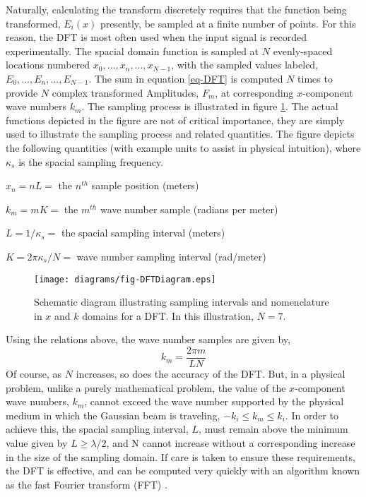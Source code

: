 \documentclass[12pt]{uthesis-v12}
\begin{document}
Naturally, calculating the transform discretely requires that the function being transformed, $E_i(x)$ presently, be sampled at a finite number of points. For this reason, the DFT is most often used when the input signal is recorded experimentally. The spacial domain function is sampled at $N$ evenly-spaced locations numbered $x_0, ..., x_n, ..., x_{N-1}$, with the sampled values labeled, $E_0, ..., E_n, ..., E_{N-1}$.  The sum in equation \ref{eq-DFT} is computed $N$ times to provide $N$ complex transformed Amplitudes, $F_m$, at corresponding $x$-component wave numbers $k_m$. The sampling process is illustrated in figure \ref{fig-DFTDiagram}. The actual functions depicted in the figure are not of critical importance, they are simply used to illustrate the sampling process and related quantities. The figure depicts the following quantities (with example units to assist in physical intuition), where $\kappa_s$ is the spacial sampling frequency. 

$x_n = nL =$ the $n^{th}$ sample position (meters)

$k_m = mK =$ the $m^{th}$ wave number sample (radians per meter)

$L = 1/\kappa_s =$ the spacial sampling interval (meters)

$K = 2\pi\kappa_s/N =$ wave number sampling interval (rad/meter)\\
\begin{figure}[htb]
\centering
\texttt{[image: diagrams/fig-DFTDiagram.eps]}
\caption[DFT schematic illustration.]{Schematic diagram illustrating sampling intervals and nomenclature in $x$ and $k$ domains for a DFT. In this illustration, $N=7$.
 \label{fig-DFTDiagram}}
\end{figure}
Using the relations above, the wave number samples are given by,
\begin{equation}\label{eq-fftfreq}
k_m=\frac{2\pi m}{LN}
\end{equation}
Of course, as $N$ increases, so does the accuracy of the DFT. But, in a physical problem, unlike a purely mathematical problem, the value of the $x$-component wave numbers, $k_m$, cannot exceed the wave number supported by the physical medium in which the Gaussian beam is traveling, $-k_i \leq k_m \leq k_i$. In order to achieve this, the spacial sampling interval, $L$, must remain above the minimum value given by $L\geq\lambda/2$, and N cannot increase without a corresponding increase in the size of the sampling domain. If care is taken to ensure these requirements, the DFT is effective, and can be computed very quickly with an algorithm known as the fast Fourier transform (FFT) \cite{fft}.
\end{document}
